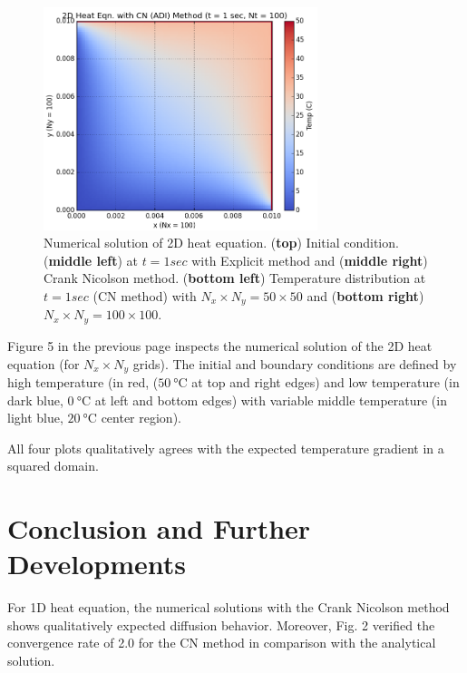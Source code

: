 \documentclass[12pt]{article}		%
\begin{document}
\begin{figure}
\includegraphics[height=6.5cm]{figure-11-2d_heat100.png}
\caption{Numerical solution of 2D heat equation. (\textbf{top}) Initial condition. (\textbf{middle left}) at $t = 1 sec$ with Explicit method and (\textbf{middle right}) Crank Nicolson method.
(\textbf{bottom left}) Temperature distribution at $t = 1 sec$ (CN method) with $N_x \times N_y = 50 \times 50$ and (\textbf{bottom right}) $N_x \times N_y = 100 \times 100$.}
\end{figure}

Figure 5 in the previous page inspects the numerical solution of the 2D heat equation (for $N_x \times N_y$ grids). The initial and boundary conditions are defined by high temperature (in red, ($\SI{50}{\degreeCelsius}$ at top and right edges) and low temperature (in dark blue, $\SI{0}{\degreeCelsius}$ at left and bottom edges) with variable middle temperature (in light blue, $\SI{20}{\degreeCelsius}$ center region).

All four plots qualitatively agrees with the expected temperature gradient in a squared domain. 


\section*{Conclusion and Further Developments}

For 1D heat equation, the numerical solutions with the Crank Nicolson method shows qualitatively expected diffusion behavior. Moreover, Fig. 2 verified the convergence rate of 2.0 for the CN method in comparison with the analytical solution.
\end{document}
